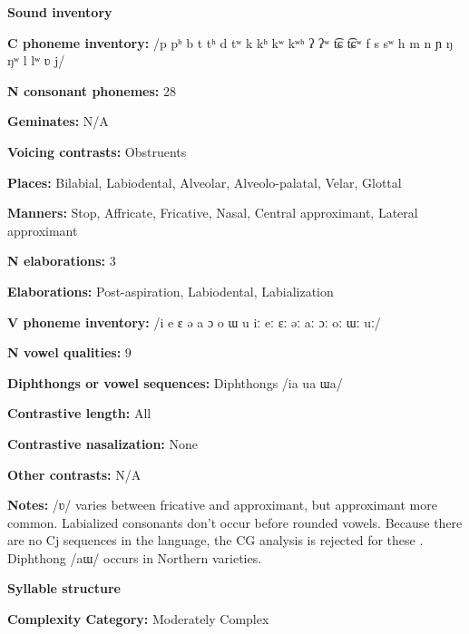 \textbf{Sound inventory}



\textbf{C phoneme inventory:} /p pʰ b t tʰ d tʷ k kʰ kʷ kʷʰ ʔ ʔʷ t͡ɕ t͡ɕʷ f s sʷ h m n ɲ ŋ ŋʷ l lʷ ʋ j/



\textbf{N consonant phonemes:} 28



\textbf{Geminates:} N/A



\textbf{Voicing contrasts:} Obstruents



\textbf{Places:} Bilabial, Labiodental, Alveolar, Alveolo-palatal, Velar, Glottal



\textbf{Manners:} Stop, Affricate, Fricative, Nasal, Central approximant, Lateral approximant



\textbf{N elaborations:} 3



\textbf{Elaborations:} Post-aspiration, Labiodental, Labialization



\textbf{V phoneme inventory:} /i e ɛ ə a ɔ o ɯ u iː eː ɛː əː aː ɔː oː ɯː uː/



\textbf{N vowel qualities:} 9



\textbf{Diphthongs or vowel sequences:} Diphthongs /ia ua ɯa/



\textbf{Contrastive length:} All



\textbf{Contrastive nasalization:} None



\textbf{Other contrasts:} N/A



\textbf{Notes:} /ʋ/ varies between fricative and approximant, but approximant more common. Labialized consonants don’t occur before rounded vowels. Because there are no Cj sequences in the language, the CG analysis is rejected for these \citep[138]{Erickson2001}. Diphthong /aɯ/ occurs in Northern varieties.



\textbf{Syllable structure}



\textbf{Complexity Category:} Moderately Complex




